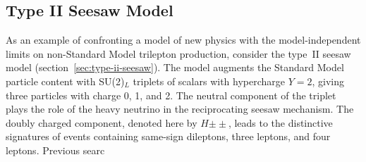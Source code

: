 \subsection{Type II Seesaw Model}
As an example of confronting a model of new physics with the model-independent limits on non-Standard Model trilepton production, consider the type~II seesaw model (section~\ref{sec:type-ii-seesaw}). The model augments the Standard Model particle content with SU(2)$_L$ triplets of scalars with hypercharge $Y=2$, giving three particles with charge 0, 1, and 2. The neutral component of the triplet plays the role of the heavy neutrino in the reciprocating seesaw mechanism. The doubly charged component, denoted here by $H{\pm\pm}$, leads to the distinctive signatures of events containing same-sign dileptons, three leptons, and four leptons. Previous searc

\printbibliography